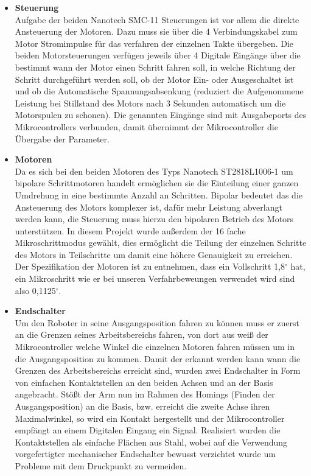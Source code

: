 \begin{itemize}
\item \textbf{Steuerung}\\
Aufgabe der beiden Nanotech SMC-11 Steuerungen ist vor allem die direkte Ansteuerung der Motoren. Dazu muss sie über die 4 Verbindungskabel zum Motor Stromimpulse für das verfahren der einzelnen Takte übergeben.
Die beiden Motorsteuerungen verfügen jeweils über 4 Digitale Eingänge über die bestimmt wann der Motor einen Schritt fahren soll, in welche Richtung der Schritt durchgeführt werden soll, ob der Motor Ein- oder Ausgeschaltet ist und ob die Automatische Spannungsabsenkung (reduziert die Aufgenommene Leistung bei Stillstand des Motors nach 3 Sekunden automatisch um die Motorspulen zu schonen).
Die genannten Eingänge sind mit Ausgabeports des Mikrocontrollers verbunden, damit übernimmt der Mikrocontroller die Übergabe der Parameter.

\item \textbf{Motoren}\\
Da es sich bei den beiden Motoren des Typs Nanotech ST2818L1006-1 um bipolare Schrittmotoren handelt ermöglichen sie die Einteilung einer ganzen Umdrehung in eine bestimmte Anzahl an Schritten. Bipolar bedeutet das die Ansteuerung des Motors komplexer ist, dafür mehr Leistung abverlangt werden kann, die Steuerung muss hierzu den bipolaren Betrieb des Motors unterstützen.
In diesem Projekt wurde außerdem der 16 fache Mikroschrittmodus gewählt, dies ermöglicht die Teilung der einzelnen Schritte des Motors in Teilschritte um damit eine höhere Genauigkeit zu erreichen. Der Spezifikation der Motoren ist zu entnehmen, dass ein Vollschritt 1,8$^\circ$ hat, ein Mikroschritt wie er bei unseren Verfahrbeweungen verwendet wird sind also 0,1125$^\circ$. 

\item \textbf{Endschalter}\\
Um den Roboter in seine Ausgangsposition fahren zu können muss er zuerst an die Grenzen seines Arbeitsbereichs fahren, von dort aus weiß der Mikrocontroller welche Winkel die einzelnen Motoren fahren müssen um in die Ausgangsposition zu kommen.
Damit der erkannt werden kann wann die Grenzen des Arbeitsbereichs erreicht sind, wurden zwei Endschalter in Form von einfachen Kontaktstellen an den beiden Achsen und an der Basis angebracht. Stößt der Arm nun im Rahmen des Homings (Finden der Ausgangsposition) an die Basis, bzw. erreicht die zweite Achse ihren Maximalwinkel, so wird ein Kontakt hergestellt und der Mikrocontroller empfängt an einem Digitalen Eingang ein Signal. Realisiert wurden die Kontaktstellen als einfache Flächen aus Stahl, wobei auf die Verwendung vorgefertigter mechanischer Endschalter bewusst verzichtet wurde um Probleme mit dem Druckpunkt zu vermeiden.
\end{itemize}


